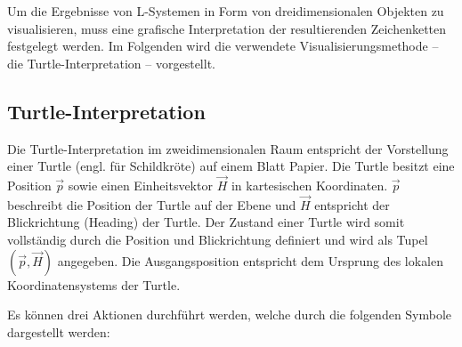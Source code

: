 Um die Ergebnisse von L-Systemen in Form von dreidimensionalen Objekten zu visualisieren, muss eine grafische Interpretation der resultierenden Zeichenketten festgelegt werden. Im Folgenden wird die verwendete Visualisierungsmethode -- die Turtle-Interpretation -- vorgestellt.

\subsection{Turtle-Interpretation}

Die Turtle-Interpretation im zweidimensionalen Raum entspricht der Vorstellung einer Turtle (engl. für Schildkröte) auf einem Blatt Papier. Die Turtle besitzt eine Position $\overrightarrow{p}$ sowie einen Einheitsvektor $\overrightarrow{H}$ in kartesischen Koordinaten. $\overrightarrow{p}$ beschreibt die Position der Turtle auf der Ebene und $\overrightarrow{H}$ entspricht der Blickrichtung (Heading) der Turtle. Der Zustand einer Turtle wird somit vollständig durch die Position und Blickrichtung definiert und wird als Tupel $(\overrightarrow{p},\overrightarrow{H})$ angegeben. \cite[S.2]{Turtle:04} Die Ausgangsposition entspricht dem Ursprung des lokalen Koordinatensystems der Turtle. 

Es können drei Aktionen durchführt werden, welche durch die folgenden Symbole dargestellt werden:

